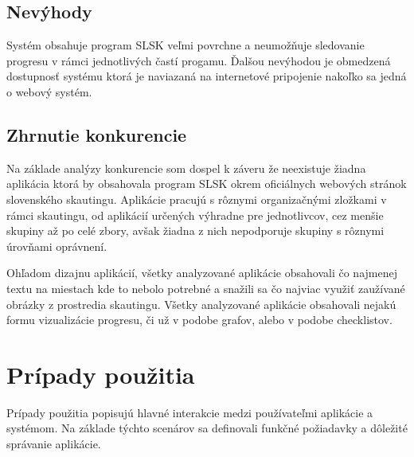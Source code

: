\subsection{Nevýhody}
Systém obsahuje program SLSK veľmi povrchne a neumožňuje sledovanie progresu v rámci jednotlivých častí progamu. Ďalšou nevýhodou je obmedzená dostupnosť systému ktorá je naviazaná na internetové pripojenie nakoľko sa jedná o webový systém.

\subsection{Zhrnutie konkurencie}
Na základe analýzy konkurencie som dospel k záveru že neexistuje žiadna aplikácia ktorá by obsahovala program SLSK okrem oficiálnych webových stránok slovenského skautingu. Aplikácie pracujú s rôznymi organizačnými zložkami v rámci skautingu, od aplikácií určených výhradne pre jednotlivcov, cez menšie skupiny až po celé zbory, avšak žiadna z nich nepodporuje skupiny s rôznymi úrovňami oprávnení.

Ohľadom dizajnu aplikácií, všetky analyzované aplikácie obsahovali čo najmenej textu na miestach kde to nebolo potrebné a snažili sa čo najviac využiť zaužívané obrázky z prostredia skautingu. Všetky analyzované aplikácie obsahovali nejakú formu vizualizácie progresu, či už v podobe grafov, alebo v podobe checklistov.

\section{Prípady použitia}

Prípady použitia popisujú hlavné interakcie medzi používateľmi aplikácie a systémom. Na základe týchto scenárov sa definovali funkčné požiadavky a dôležité správanie aplikácie.

